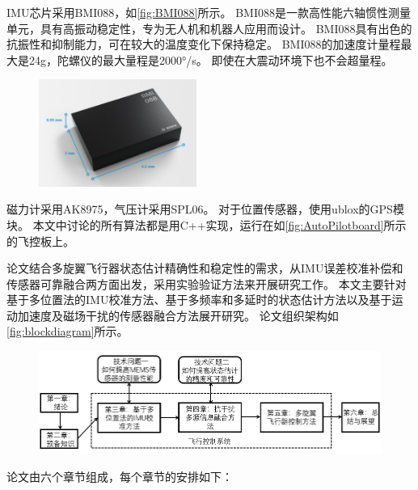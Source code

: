 \documentclass[
  type=master
]{gdutthesis}
\begin{document}
IMU芯片采用BMI088，如\autoref{fig:BMI088}所示。
BMI088是一款高性能六轴惯性测量单元，具有高振动稳定性，专为无人机和机器人应用而设计。
BMI088具有出色的抗振性和抑制能力，可在较大的温度变化下保持稳定。
BMI088的加速度计量程最大是24g，陀螺仪的最大量程是2000°/s。
即使在大震动环境下也不会超量程。
\begin{figure}[H]
	\centering
	\includegraphics[width=0.46\textwidth]{屏幕截图 2022-03-30 151212.png}
	\label{fig:BMI088}
\end{figure}

磁力计采用AK8975，气压计采用SPL06。
对于位置传感器，使用ublox的GPS模块。
本文中讨论的所有算法都是用C++实现，运行在如\autoref{fig:AutoPilotboard}所示的飞控板上。

论文结合多旋翼飞行器状态估计精确性和稳定性的需求，从IMU误差校准补偿和传感器可靠融合两方面出发，采用实验验证方法来开展研究工作。
本文主要针对基于多位置法的IMU校准方法、基于多频率和多延时的状态估计方法以及基于运动加速度及磁场干扰的传感器融合方法展开研究。
论文组织架构如\autoref{fig:blockdiagram}所示。
\begin{figure}[H]
	\centering
	\includegraphics[width=1.0\textwidth]{屏幕截图 2022-05-05 153942.png}
	\label{fig:blockdiagram}
\end{figure}

论文由六个章节组成，每个章节的安排如下：
\end{document}
